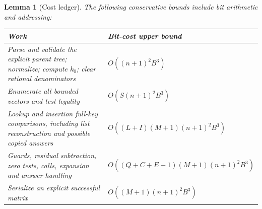 \documentclass[11pt,a4paper]{article}
\newtheorem{lemma}[theorem]{Lemma}
\theoremstyle{definition}
\theoremstyle{remark}
\begin{document}
\begin{lemma}[Cost ledger]\label{lem:ledger}
The following conservative bounds include bit arithmetic and addressing:
\begin{center}
\small
\begin{tabular}{@{}p{.48\linewidth}p{.40\linewidth}@{}}
\toprule
Work & Bit-cost upper bound\\
\midrule
Parse and validate the explicit parent tree; normalize; compute \(k_0\);
clear rational denominators & \(O((n+1)^2B^3)\)\\
Enumerate all bounded vectors and test legality & \(O(S(n+1)^2B^3)\)\\
Lookup and insertion full-key comparisons, including list reconstruction
and possible copied answers & \(O((L+I)(M+1)(n+1)^2B^3)\)\\
Guards, residual subtraction, zero tests, calls, expansion and answer handling
& \(O((Q+C+E+1)(M+1)(n+1)^2B^3)\)\\
Serialize an explicit successful matrix & \(O((M+1)(n+1)^2B^3)\)\\
\bottomrule
\end{tabular}
\end{center}
\end{lemma}
\end{document}

